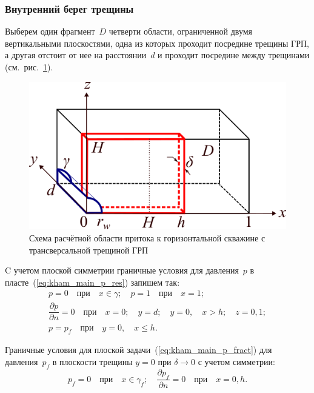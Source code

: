 \documentclass{article}
\begin{document}
\subsubsection{Внутренний берег трещины}
Выберем один фрагмент~$D$ четверти области, ограниченной двумя вертикальными плоскостями, одна из которых
проходит посредине трещины ГРП, а другая отстоит от нее на расстоянии~$d$ и проходит посредине между
трещинами (см.~рис.~\ref{fig:kham_fract_inner_scheme}).

\begin{figure}[H]
	\centering
	\includegraphics[width=0.7\linewidth]{images/schemes/kham_fract_inner_scheme.png}
	\caption{Схема расчётной области притока к горизонтальной скважине с трансверсальной трещиной ГРП}
	\label{fig:kham_fract_inner_scheme}
\end{figure}

C учетом плоской симметрии граничные условия для давления~$p$ в пласте~(\ref{eq:kham_main_p_res}) запишем так:
\begin{equation}
	\displaystyle
	\begin{gathered}
		p = 0 \quad \text{при} \quad x \in \gamma; \quad p=1 \quad \text{при} \quad x = 1; \\
		\dfrac{\partial p}{\partial n} = 0 \quad \text{при} \quad x=0; \quad
		y = d; \quad y = 0, \quad x > h; \quad z = 0,1; \\
		p = p_f \quad \text{при} \quad y = 0, \quad x \leq h.
	\end{gathered}
	\label{eq:kham_fract_inner_main_boundaries}
\end{equation}

Граничные условия для плоской задачи~(\ref{eq:kham_main_p_fract}) для давления~$p_f$ в
плоскости трещины $y=0$ при $\delta \to 0$ с учетом симметрии:
\begin{equation}
	\displaystyle
	p_f = 0 \quad \text{при} \quad x \in \gamma_f; \quad \dfrac{\partial p_f}{\partial n} = 0 \quad \text{при} \quad x=0, h.
	\label{eq:kham_fract_inner_main_pf_boundaries}
\end{equation}
\end{document}
